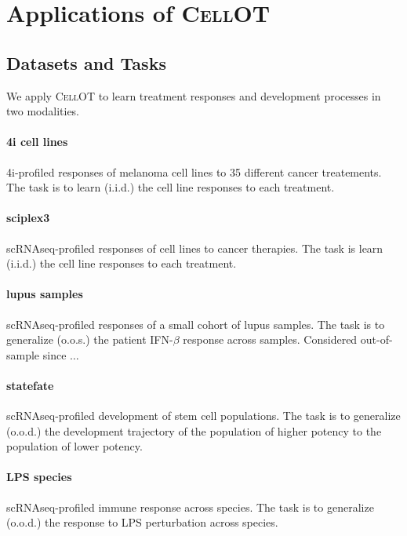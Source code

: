 \section{Applications of \textsc{CellOT}}
\subsection{Datasets and Tasks}

We apply \textsc{CellOT} to learn treatment responses and development processes in two modalities.

\paragraph{4i cell lines}
4i-profiled \cite{gut2018multiplexed} responses of melanoma cell lines to 35 different cancer treatements.
The task is to learn (i.i.d.) the cell line responses to each treatment.

\paragraph{sciplex3}
scRNAseq-profiled responses of cell lines to cancer therapies.
The task is learn (i.i.d.) the cell line responses to each treatment.

\paragraph{lupus samples}
scRNAseq-profiled responses of a small cohort of lupus samples.
The task is to generalize (o.o.s.) the patient IFN-$\beta$ response across samples.
Considered out-of-sample since $\ldots$ %

\paragraph{statefate}
scRNAseq-profiled development of stem cell populations.
The task is to generalize (o.o.d.) the development trajectory of the population of higher potency to the population of lower potency.

\paragraph{LPS species}
scRNAseq-profiled immune response across species.
The task is to generalize (o.o.d.) the response to LPS perturbation across species.

